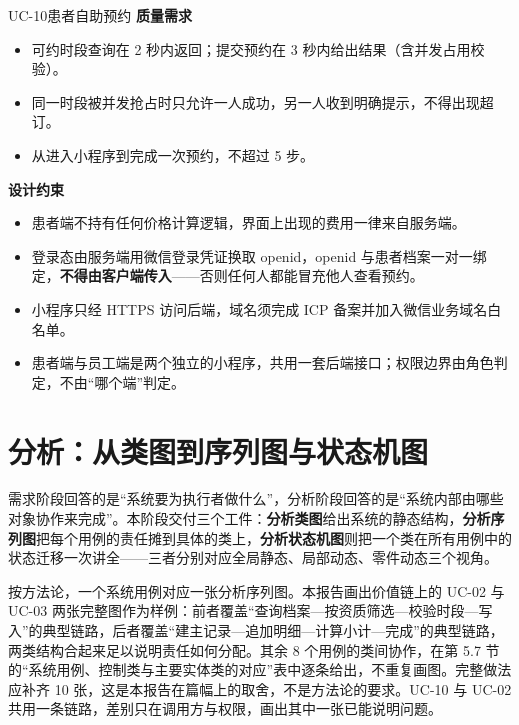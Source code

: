 \documentclass[11pt,a4paper]{ctexart}
\begin{document}
\begin{ucbox}{UC-10\quad 患者自助预约}
\vspace{2pt}
\textbf{质量需求}
\begin{itemize}[leftmargin=1.4em,topsep=2pt,itemsep=1pt]
  \item 可约时段查询在 2 秒内返回；提交预约在 3 秒内给出结果（含并发占用校验）。
  \item 同一时段被并发抢占时只允许一人成功，另一人收到明确提示，不得出现超订。
  \item 从进入小程序到完成一次预约，不超过 5 步。
\end{itemize}

\vspace{2pt}
\textbf{设计约束}
\begin{itemize}[leftmargin=1.4em,topsep=2pt,itemsep=1pt]
  \item 患者端不持有任何价格计算逻辑，界面上出现的费用一律来自服务端。
  \item 登录态由服务端用微信登录凭证换取 openid，openid 与患者档案一对一绑定，\textbf{不得由客户端传入}——否则任何人都能冒充他人查看预约。
  \item 小程序只经 HTTPS 访问后端，域名须完成 ICP 备案并加入微信业务域名白名单。
  \item 患者端与员工端是两个独立的小程序，共用一套后端接口；权限边界由角色判定，不由“哪个端”判定。
\end{itemize}
\end{ucbox}

\section{分析：从类图到序列图与状态机图}

需求阶段回答的是“系统要为执行者做什么”，分析阶段回答的是“系统内部由哪些对象协作来完成”。本阶段交付三个工件：\textbf{分析类图}给出系统的静态结构，\textbf{分析序列图}把每个用例的责任摊到具体的类上，\textbf{分析状态机图}则把一个类在所有用例中的状态迁移一次讲全——三者分别对应全局静态、局部动态、零件动态三个视角。

按方法论，一个系统用例对应一张分析序列图。本报告画出价值链上的 UC-02 与 UC-03 两张完整图作为样例：前者覆盖“查询档案—按资质筛选—校验时段—写入”的典型链路，后者覆盖“建主记录—追加明细—计算小计—完成”的典型链路，两类结构合起来足以说明责任如何分配。其余 8 个用例的类间协作，在第 5.7 节的“系统用例、控制类与主要实体类的对应”表中逐条给出，不重复画图。完整做法应补齐 10 张，这是本报告在篇幅上的取舍，不是方法论的要求。UC-10 与 UC-02 共用一条链路，差别只在调用方与权限，画出其中一张已能说明问题。
\end{document}

